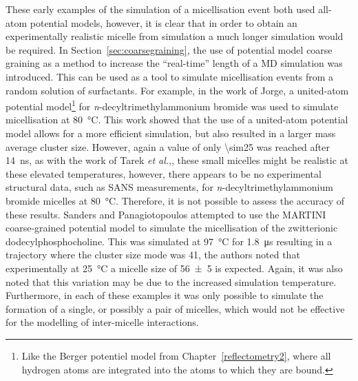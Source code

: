 These early examples of the simulation of a micellisation event both used all-atom potential models,\autocite{tarek_molecular_1998,maillet_large_1999} however, it is clear that in order to obtain an experimentally realistic micelle from simulation a much longer simulation would be required.
In Section~\ref{sec:coarsegraining}, the use of potential model coarse graining as a method to increase the ``real-time'' length of a MD simulation was introduced.
This can be used as a tool to simulate micellisation events from a random solution of surfactants.
For example, in the work of Jorge,\autocite{jorge_molecular_2008} a united-atom potential model\footnote{Like the Berger potentiel model from Chapter~\ref{reflectometry2}, where all hydrogen atoms are integrated into the atoms to which they are bound.} for \emph{n}-decyltrimethylammonium bromide was used to simulate micellisation at \SI{80}{\celsius}.
This work showed that the use of a united-atom potential model allows for a more efficient simulation, but also resulted in a larger mass average cluster size.
However, again a value of only \num{\sim25} was reached after \SI{14}{\nano\second}, as with the work of Tarek \emph{et al.},\autocite{tarek_molecular_1998}, these small micelles might be realistic at these elevated temperatures, however, there appears to be no experimental structural data, such as SANS measurements, for \emph{n}-decyltrimethylammonium bromide micelles at \SI{80}{\celsius}.
Therefore, it is not possible to assess the accuracy of these results.
Sanders and Panagiotopoulos attempted to use the MARTINI coarse-grained potential model to simulate the micellisation of the zwitterionic dodecylphosphocholine.\autocite{sanders_micellization_2010}
This was simulated at \SI{97}{\celsius} for \SI{1.8}{\micro\second} resulting in a trajectory where the cluster size mode was 41, the authors noted that experimentally at \SI{25}{\celsius} a micelle size of \num{56\pm5} is expected.
Again, it was also noted that this variation may be due to the increased simulation temperature.\autocite{malliaris_temperature_1985,kamenka_aqueous_1995}
Furthermore, in each of these examples it was only possible to simulate the formation of a single, or possibly a pair of micelles, which would not be effective for the modelling of inter-micelle interactions.

